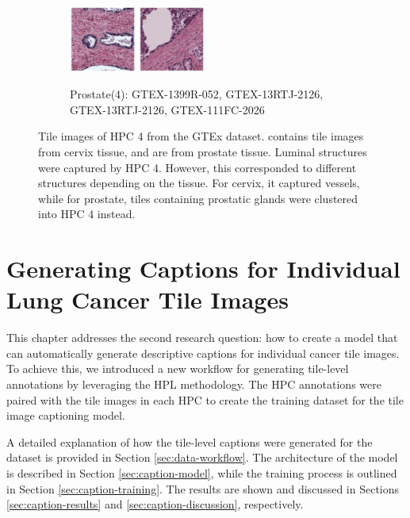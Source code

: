 \documentclass{l4proj}
\begin{document}
\begin{figure}[h]
\begin{subfigure}[b]{\textwidth}
        \includegraphics[width=0.24\textwidth]{images/prostate4_3.png}
        \includegraphics[width=0.24\textwidth]{images/prostate4_4.png}
        \caption{Prostate(4): GTEX-1399R-052, GTEX-13RTJ-2126, GTEX-13RTJ-2126, GTEX-111FC-2026}
        \label{fig:prostate4}
    \end{subfigure}
    \caption{Tile images of HPC 4 from the GTEx dataset.  contains tile images from cervix tissue, and  are from prostate tissue. Luminal structures were captured by HPC 4. However, this corresponded to different structures depending on the tissue. For cervix, it captured vessels, while for prostate, tiles containing prostatic glands were clustered into HPC 4 instead.
    }\label{fig:hpc4}
\end{figure}

\chapter{Generating Captions for Individual Lung Cancer Tile Images} \label{sec:caption}

This chapter addresses the second research question: how to create a model that can automatically generate descriptive captions for individual cancer tile images. To achieve this, we introduced a new workflow for generating tile-level annotations by leveraging the HPL methodology. The HPC annotations were paired with the tile images in each HPC to create the training dataset for the tile image captioning model.

A detailed explanation of how the tile-level captions were generated for the dataset is provided in Section \ref{sec:data-workflow}. The architecture of the model is described in Section \ref{sec:caption-model}, while the training process is outlined in Section \ref{sec:caption-training}. The results are shown and discussed in Sections \ref{sec:caption-results} and \ref{sec:caption-discussion}, respectively.
\end{document}
